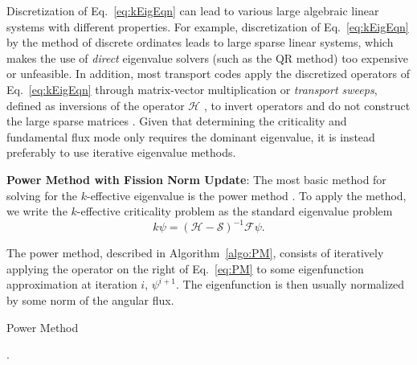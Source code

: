 Discretization of Eq.~\ref{eq:kEigEqn} can lead to various large algebraic linear systems with different properties. For example, discretization of Eq.~\ref{eq:kEigEqn} by the method of discrete ordinates leads to large sparse linear systems, which makes the use of \textit{direct} eigenvalue solvers (such as the QR method) too expensive or unfeasible. In addition, most transport codes apply the discretized operators of Eq.~\ref{eq:kEigEqn} through matrix-vector multiplication or \textit{transport sweeps}, defined as inversions of the operator $\mathcal{H}$ \cite{willert_comparison_2014}, to invert operators and do not construct the large sparse matrices \cite{lewis_computational_1984}. Given that determining the criticality and fundamental flux mode only requires the dominant eigenvalue, it is instead preferably to use iterative eigenvalue methods.

\textbf{Power Method with Fission Norm Update}: The most basic method for solving for the $k$-effective eigenvalue is the power method \cite{lewis_computational_1984}. To apply the method, we write the $k$-effective criticality problem as the standard eigenvalue problem
\begin{equation}
k \psi = (\mathcal{H} - \mathcal{S})^{-1} \mathcal{F}\psi.
\label{eq:PM}
\end{equation}

The power method, described in Algorithm~\ref{algo:PM}, consists of iteratively applying the operator on the right of Eq.~\ref{eq:PM} to some eigenfunction approximation at iteration $i$, $\psi^{i+1}$. The eigenfunction is then usually normalized by some norm of the angular flux.%

\begin{algorithm}[H]
				\caption{Power Method \cite{lewis_computational_1984}}
				\begin{algorithmic}[1]
						.
					\ENDFOR
				\end{algorithmic}
				\label{algo:PM}
\end{algorithm}

